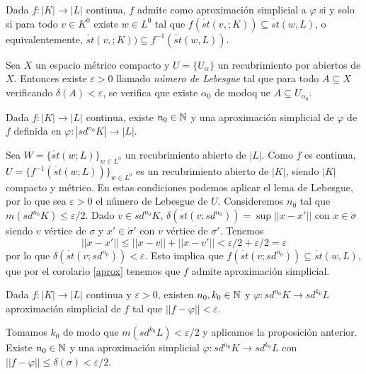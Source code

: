 \documentclass[HS.tex]{subfiles}
\begin{document}
\begin{coro}\label{aprox}
Dada $f:|K|\to|L|$ continua, $f$ admite como aproximación simplicial a $\varphi$ si y solo si para todo $v\in K^0$ existe $w\in L^0$ tal que $f(\mathring{st}(v,;K))\subseteq \mathring{st}(w,L)$, o equivalentemente, $\mathring{st}(v,;K))\subseteq f^{-1}(\mathring{st}(w,L))$. 
\end{coro}

\begin{lemma}[de Lebesgue]
Sea $X$ un espacio métrico compacto y $U=\{U_\alpha\}$ un recubrimiento por abiertos de $X$. Entonces existe $\varepsilon>0$ llamado \emph{número de Lebesgue} tal que para todo $A\subseteq X$ verificando $\delta(A)<\varepsilon$, se verifica que existe $\alpha_0$ de modoq ue $A\subseteq U_{\alpha_0}$.
\end{lemma}

\begin{prop}
Dada $f:|K|\to |L|$ continua, existe $n_0\in\mathbb{N}$ y una aproximación simplicial de $\varphi$ de $f$ definida en $\varphi:|sd^{n_0}K|\to |L|$. 
\end{prop}
\begin{dem}
Sea $W=\{\mathring{st}(w;L)\}_{w\in L^0}$ un recubrimiento abierto de $|L|$. Como $f$ es continua, $U=\{f^{-1}(\mathring{st}(w;L))\}_{w\in L^0}$ es un recubrimiento abierto de $|K|$, siendo $|K|$ compacto y métrico. En estas condiciones podemos aplicar el lema de Lebesgue, por lo que sea $\varepsilon>0$ el número de Lebesgue de $U$. Consideremos $n_0$ tal que $m(sd^{n_0}K)\leq\varepsilon/2$. Dado $v\in sd^{n_0}K$, $\delta(\mathring{st}(v; sd^{n_0}))=\sup ||x-x'||$ con $x\in\mathring{\sigma}$ siendo $v$ vértice de $\sigma$ y $x'\in \mathring{\sigma}'$ con $v$ vértice de $\sigma'$. Tenemos
\[
||x-x'||\leq ||x-v||+||x-v'||<\varepsilon/2+\varepsilon/2=\varepsilon
\]
por lo que $\delta(\mathring{st}(v; sd^{n_0}))<\varepsilon$. Esto implica que $f(\mathring{st}(v; sd^{n_0}))\subseteq\mathring{st}(w,L)$, que por el corolario \ref{aprox} tenemos que $f$ admite aproximación simplicial. 
\QED
\end{dem}

\begin{coro}
Dada $f:|K|\to|L|$ continua y $\varepsilon>0$, existen $n_0,k_0\in\mathbb{N}$ y $\varphi:sd^{n_0}K\to sd^{k_0}L$ aproximación simplicial de $f$ tal que $||f-\varphi||<\varepsilon$.
\end{coro}
\begin{dem}
Tomamos $k_0$ de modo que $m(sd^{k_0}L)<\varepsilon/2$ y aplicamos la proposición anterior. Existe $n_0\in\mathbb{N}$ y una aproximación simplicial $\varphi:sd^{n_0}K\to sd^{k_0}L$ con $||f-\varphi||\leq \delta(\sigma)<\varepsilon/2$. \QED
\end{dem}
\end{document}
